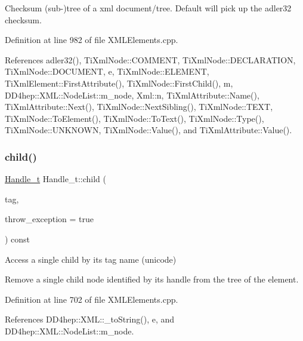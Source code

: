 Checksum (sub-\/)tree of a xml document/tree. Default will pick up the adler32 checksum. 



Definition at line 982 of file X\+M\+L\+Elements.\+cpp.



References adler32(), Ti\+Xml\+Node\+::\+C\+O\+M\+M\+E\+NT, Ti\+Xml\+Node\+::\+D\+E\+C\+L\+A\+R\+A\+T\+I\+ON, Ti\+Xml\+Node\+::\+D\+O\+C\+U\+M\+E\+NT, e, Ti\+Xml\+Node\+::\+E\+L\+E\+M\+E\+NT, Ti\+Xml\+Element\+::\+First\+Attribute(), Ti\+Xml\+Node\+::\+First\+Child(), m, D\+D4hep\+::\+X\+M\+L\+::\+Node\+List\+::m\+\_\+node, Xml\+::n, Ti\+Xml\+Attribute\+::\+Name(), Ti\+Xml\+Attribute\+::\+Next(), Ti\+Xml\+Node\+::\+Next\+Sibling(), Ti\+Xml\+Node\+::\+T\+E\+XT, Ti\+Xml\+Node\+::\+To\+Element(), Ti\+Xml\+Node\+::\+To\+Text(), Ti\+Xml\+Node\+::\+Type(), Ti\+Xml\+Node\+::\+U\+N\+K\+N\+O\+WN, Ti\+Xml\+Node\+::\+Value(), and Ti\+Xml\+Attribute\+::\+Value().

\hypertarget{class_d_d4hep_1_1_x_m_l_1_1_handle__t_aba89b01b45f745b58bf27c9463f05742}{}\label{class_d_d4hep_1_1_x_m_l_1_1_handle__t_aba89b01b45f745b58bf27c9463f05742} 
\subsubsection{\texorpdfstring{child()}{child()}}
{\footnotesize\ttfamily \hyperlink{class_d_d4hep_1_1_x_m_l_1_1_handle__t}{Handle\+\_\+t} Handle\+\_\+t\+::child (\begin{DoxyParamCaption}\item[{const \hyperlink{namespace_d_d4hep_1_1_x_m_l_a09e5d9cc86ed782f6826dfe0778c1815}{Xml\+Char} $\ast$}]{tag,  }\item[{bool}]{throw\+\_\+exception = {\ttfamily true} }\end{DoxyParamCaption}) const}



Access a single child by it\textquotesingle{}s tag name (unicode) 

Remove a single child node identified by it\textquotesingle{}s handle from the tree of the element. 

Definition at line 702 of file X\+M\+L\+Elements.\+cpp.



References D\+D4hep\+::\+X\+M\+L\+::\+\_\+to\+String(), e, and D\+D4hep\+::\+X\+M\+L\+::\+Node\+List\+::m\+\_\+node.



